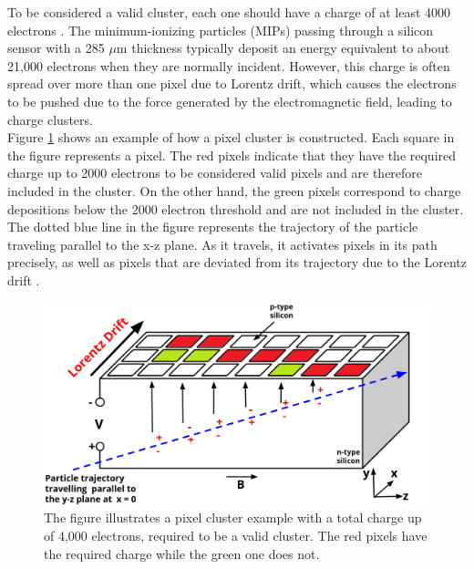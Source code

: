 To be considered a valid cluster, each one should have a charge of at least 4000 electrons \cite{Track_Reco_2014,phase1_Pixel_Detector}. The minimum-ionizing particles (MIPs) passing through a silicon sensor with a 285 $\mu \text{m}$ thickness typically deposit an energy equivalent to about 21,000 electrons when they are normally incident. However, this charge is often spread over more than one pixel due to Lorentz drift,  which causes the electrons to be pushed due to the force generated by the electromagnetic field, leading to charge clusters.\\

Figure \ref{cluster}  shows an example of how a pixel cluster is constructed. Each square in the figure represents a pixel. The red pixels indicate that they have the required charge up to 2000 electrons to be considered valid pixels and are therefore included in the cluster. On the other hand, the green pixels correspond to charge depositions below the 2000 electron threshold and are not included in the cluster.
The dotted blue line in the figure represents the trajectory of the particle traveling parallel to the x-z plane. As it travels, it activates pixels in its path precisely, as well as pixels that are deviated from its trajectory due to the Lorentz drift \cite{Pixel_Hit_Reconstruction}.\\

\begin{center}
  \begin{figure}[h]
    \centering
    \includegraphics[scale=.25]{Chapter2/pixel_cluster.png} 
    \caption[Construction of a pixel cluster]{ The figure illustrates a pixel cluster example with a total charge up of 4,000 electrons, required to be a valid cluster. The red pixels have the required charge while the green one does not.}
    \label{cluster}
  \end{figure}
\end{center}
